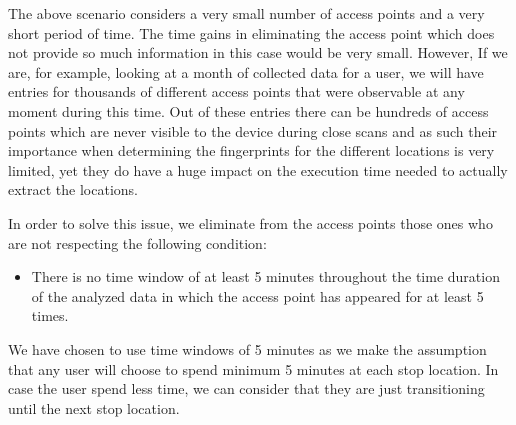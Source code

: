 The above scenario considers a very small number of access points and a very
short period of time. The time gains in eliminating the access point which does
not provide so much information in this case would be very small. However, If we
are, for example, looking at a month of collected data for a user, we will have
entries for thousands of different access points that were observable at any
moment during this time. Out of these entries there can be hundreds of access
points which are never visible to the device during close scans and as such
their importance when determining the fingerprints for the different locations
is very limited, yet they do have a huge impact on the execution time needed to
actually extract the locations.

In order to solve this issue, we eliminate from the access points those ones who
are not respecting the following condition:
\begin{itemize}
  \item There is no time window of at least 5 minutes throughout the time
  duration of the analyzed data in which the access point has appeared for at
  least 5 times. %
\end{itemize}

We have chosen to use time windows of 5 minutes as we make the assumption that
any user will choose to spend minimum 5 minutes at each stop location. In case
the user spend less time, we can consider that they are just transitioning until
the next stop location.

